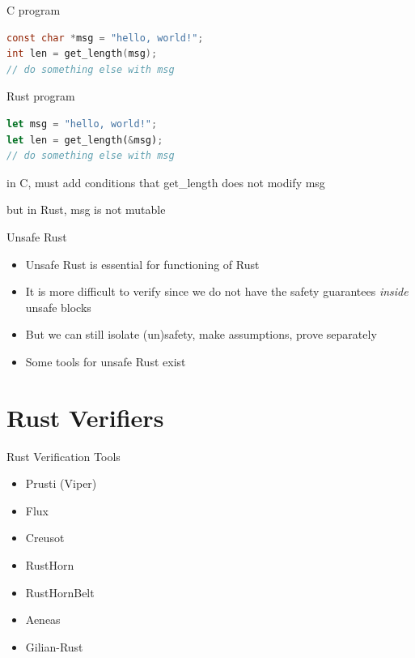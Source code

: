 \documentclass{beamer}
\begin{document}
\begin{frame}[fragile]
\begin{block}{C program}
\begin{lstlisting}[language=C]
const char *msg = "hello, world!"; 
int len = get_length(msg);
// do something else with msg
\end{lstlisting}
\end{block}

\begin{block}{Rust program}
\begin{lstlisting}[language=rust]
let msg = "hello, world!"; 
let len = get_length(&msg);  
// do something else with msg
\end{lstlisting}
\end{block}


in C, must add conditions that get\_length does not modify 
msg

but in Rust, msg is not mutable
\end{frame}

\begin{frame}{Unsafe Rust} 
\begin{itemize}
\item 
Unsafe Rust is essential for functioning of Rust 
\item 
It is more difficult to verify since we do not have the safety guarantees \emph{inside} unsafe blocks
\item 
But we can still isolate (un)safety, make assumptions, prove separately
\item 
Some tools for unsafe Rust exist
\end{itemize} 
\end{frame} 




\section{Rust Verifiers}

\begin{frame}{Rust Verification Tools}
\begin{itemize} 
\item Prusti (Viper)
\item Flux
\item Creusot
\item RustHorn
\item RustHornBelt
\item Aeneas
\item Gilian-Rust
\end{itemize} 
\end{frame}
\end{document}
